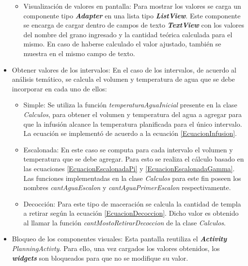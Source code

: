 \begin{itemize}
\begin{itemize}
                        \item Visualización de valores en pantalla: Para mostrar los valores se carga un componente tipo \textbf{ \textit{\gls{Adapter}}} en una lista tipo \textbf{\textit{\gls{ListView}}}. Este componente se encarga de cargar dentro de campos de texto \textbf{\textit{\gls{TextView}}} con los valores del nombre del grano ingresado y la cantidad teórica calculada para el mismo. En caso de haberse calculado el valor ajustado, también se muestra en el mismo campo de texto.
                    \end{itemize}
                
                \item Obtener valores de los intervalos:
                    En el caso de los intervalos, de acuerdo al análisis temático, se calcula el volumen y temperatura de agua que se debe incorporar en cada uno de ellos:
                    \begin{itemize}
                        \item Simple: Se utiliza la función \textit{temperaturaAguaInicial} presente en la clase \textit{Calculos}, para obtener el volumen y temperatura del agua a agregar para que la infusión alcance la temperatura planificada para el único intervalo. La ecuación se implementó de acuerdo a la ecuación \ref{EcuacionInfusion}.
                    
                        \item Escalonada: En este caso se computa para cada intervalo el volumen y temperatura que se debe agregar. Para esto se realiza el cálculo basado en las ecuaciones \ref{EcuacionEscalonadaPi} y \ref{EcuacionEscalonadaGamma}. Las funciones implementadas en la clase \textit{Calculos} para este fin poseen los nombres \textit{cantAguaEscalon} y \textit{cantAguaPrimerEscalon} respectivamente.
                    
                        \item Decocción: Para este tipo de maceración se calcula la cantidad de templa a retirar según la ecuación \ref{EcuacionDecoccion}. Dicho valor es obtenido al llamar la función \textit{cantMostoRetirarDecoccion} de la clase \textit{Calculos}.
                    \end{itemize}
                    
                    \item Bloqueo de los componentes visuales:  Esta pantalla reutiliza el \textbf{\textit{Activity}} \textit{PlanningActivty}. Para ello, una vez cargados los valores obtenidos, los \textbf{\textit{\gls{widget}s}} son bloqueados para que no se modifique su valor.

            \end{itemize}
            
